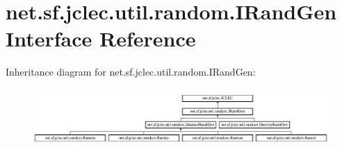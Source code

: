 \hypertarget{interfacenet_1_1sf_1_1jclec_1_1util_1_1random_1_1_i_rand_gen}{\section{net.\-sf.\-jclec.\-util.\-random.\-I\-Rand\-Gen Interface Reference}
\label{interfacenet_1_1sf_1_1jclec_1_1util_1_1random_1_1_i_rand_gen}
}
Inheritance diagram for net.\-sf.\-jclec.\-util.\-random.\-I\-Rand\-Gen\-:\begin{figure}[H]
\begin{center}
\leavevmode
\includegraphics[height=2.231076cm]{interfacenet_1_1sf_1_1jclec_1_1util_1_1random_1_1_i_rand_gen}
\end{center}
\end{figure}
